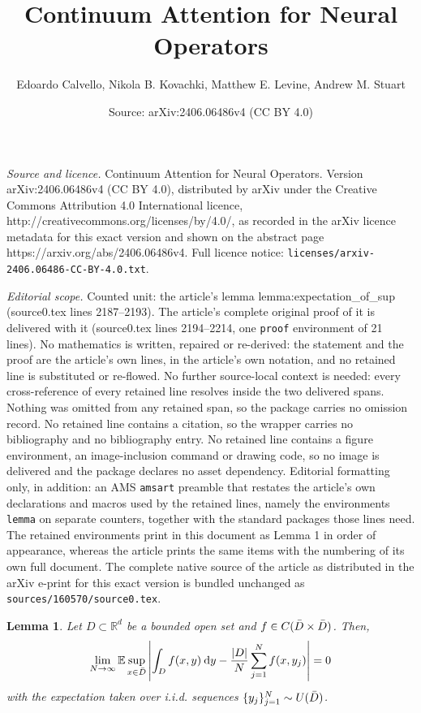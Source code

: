 \documentclass[10pt,a4paper]{amsart}
\title{Continuum Attention for Neural Operators}
\author{Edoardo Calvello, Nikola B. Kovachki, Matthew E. Levine, Andrew M. Stuart}
\date{Source: arXiv:2406.06486v4 (CC BY 4.0)}
\newtheorem{lemma}{Lemma}
\newcommand{\E}{\mathbb{E}}
\newcommand{\R}{\mathbbm{R}}
\providecommand{\mathbbm}{\mathbb} %
\begin{document}
\maketitle

\noindent\emph{Source and licence.} Continuum Attention for Neural Operators. Version arXiv:2406.06486v4 (CC BY 4.0), distributed by arXiv under the Creative Commons Attribution 4.0 International licence, http://creativecommons.org/licenses/by/4.0/, as recorded in the arXiv licence metadata for this exact version and shown on the abstract page https://arxiv.org/abs/2406.06486v4. Full licence notice: \texttt{licenses/arxiv-2406.06486-CC-BY-4.0.txt}.\par\smallskip

\noindent\textit{Editorial scope.} Counted unit: the article's lemma lemma:expectation\_of\_sup (source0.tex lines 2187--2193). The article's complete original proof of it is delivered with it (source0.tex lines 2194--2214, one \texttt{proof} environment of 21 lines). No mathematics is written, repaired or re-derived: the statement and the proof are the article's own lines, in the article's own notation, and no retained line is substituted or re-flowed.  No further source-local context is needed: every cross-reference of every retained line resolves inside the two delivered spans.  Nothing was omitted from any retained span, so the package carries no omission record.  No retained line contains a citation, so the wrapper carries no bibliography and no bibliography entry.  No retained line contains a figure environment, an image-inclusion command or drawing code, so no image is delivered and the package declares no asset dependency.  Editorial formatting only, in addition: an AMS \texttt{amsart} preamble that restates the article's own declarations and macros used by the retained lines, namely the environments \texttt{lemma} on separate counters, together with the standard packages those lines need.  The retained environments print in this document as Lemma 1 in order of appearance, whereas the article prints the same items with the numbering of its own full document.  The complete native source of the article as distributed in the arXiv e-print for this exact version is bundled unchanged as \texttt{sources/160570/source0.tex}.
\begin{lemma}
\label{lemma:expectation_of_sup}
Let \(D \subset \R^d\) be a bounded open set and \(f \in C(\Bar{D} \times \Bar{D})\).
Then,
\[ \lim_{N \to \infty} \E \sup_{x \in \Bar{D}} \left | \int_D f(x,y) \: \mathrm{d}y - \frac{|D|}{N} \sum_{j=1}^N f(x,y_j) \right |= 0\]
with the expectation taken over i.i.d. sequences \(\{y_j\}_{j=1}^N \sim U(\Bar{D})\).
\end{lemma}
\end{document}
